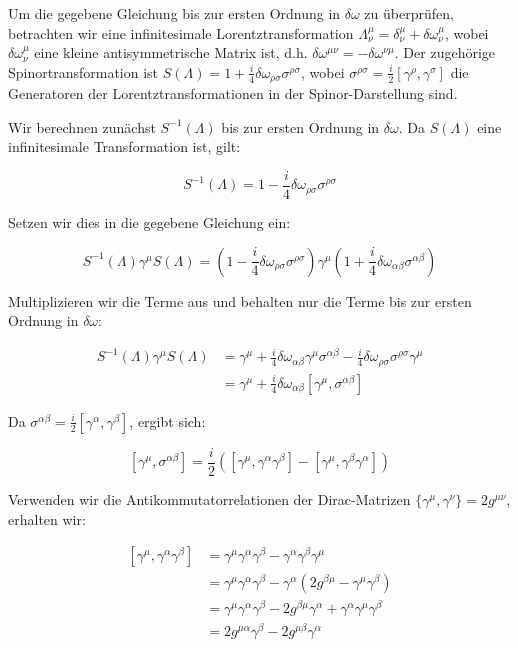 Um die gegebene Gleichung bis zur ersten Ordnung in $\delta \omega$ zu überprüfen, betrachten wir eine infinitesimale Lorentztransformation $\Lambda^\mu_\nu = \delta^\mu_\nu + \delta \omega^\mu_\nu$, wobei $\delta \omega^\mu_\nu$ eine kleine antisymmetrische Matrix ist, d.h. $\delta \omega^{\mu\nu} = -\delta \omega^{\nu\mu}$. Der zugehörige Spinortransformation ist $S(\Lambda) = 1 + \frac{i}{4} \delta \omega_{\rho\sigma} \sigma^{\rho\sigma}$, wobei $\sigma^{\rho\sigma} = \frac{i}{2} [\gamma^\rho, \gamma^\sigma]$ die Generatoren der Lorentztransformationen in der Spinor-Darstellung sind.

Wir berechnen zunächst $S^{-1}(\Lambda)$ bis zur ersten Ordnung in $\delta \omega$. Da $S(\Lambda)$ eine infinitesimale Transformation ist, gilt:

\[
S^{-1}(\Lambda) = 1 - \frac{i}{4} \delta \omega_{\rho\sigma} \sigma^{\rho\sigma}
\]

Setzen wir dies in die gegebene Gleichung ein:

\[
S^{-1}(\Lambda) \gamma^\mu S(\Lambda) = \left(1 - \frac{i}{4} \delta \omega_{\rho\sigma} \sigma^{\rho\sigma}\right) \gamma^\mu \left(1 + \frac{i}{4} \delta \omega_{\alpha\beta} \sigma^{\alpha\beta}\right)
\]

Multiplizieren wir die Terme aus und behalten nur die Terme bis zur ersten Ordnung in $\delta \omega$:

\[
\begin{align*}
S^{-1}(\Lambda) \gamma^\mu S(\Lambda) &= \gamma^\mu + \frac{i}{4} \delta \omega_{\alpha\beta} \gamma^\mu \sigma^{\alpha\beta} - \frac{i}{4} \delta \omega_{\rho\sigma} \sigma^{\rho\sigma} \gamma^\mu \\
&= \gamma^\mu + \frac{i}{4} \delta \omega_{\alpha\beta} [\gamma^\mu, \sigma^{\alpha\beta}]
\end{align*}
\]

Da $\sigma^{\alpha\beta} = \frac{i}{2} [\gamma^\alpha, \gamma^\beta]$, ergibt sich:

\[
[\gamma^\mu, \sigma^{\alpha\beta}] = \frac{i}{2} \left( [\gamma^\mu, \gamma^\alpha \gamma^\beta] - [\gamma^\mu, \gamma^\beta \gamma^\alpha] \right)
\]

Verwenden wir die Antikommutatorrelationen der Dirac-Matrizen $\{\gamma^\mu, \gamma^\nu\} = 2g^{\mu\nu}$, erhalten wir:

\[
\begin{align*}
[\gamma^\mu, \gamma^\alpha \gamma^\beta] &= \gamma^\mu \gamma^\alpha \gamma^\beta - \gamma^\alpha \gamma^\beta \gamma^\mu \\
&= \gamma^\mu \gamma^\alpha \gamma^\beta - \gamma^\alpha (2g^{\beta\mu} - \gamma^\mu \gamma^\beta) \\
&= \gamma^\mu \gamma^\alpha \gamma^\beta - 2g^{\beta\mu} \gamma^\alpha + \gamma^\alpha \gamma^\mu \gamma^\beta \\
&= 2g^{\mu\alpha} \gamma^\beta - 2g^{\mu\beta} \gamma^\alpha
\end{align*}
\]

